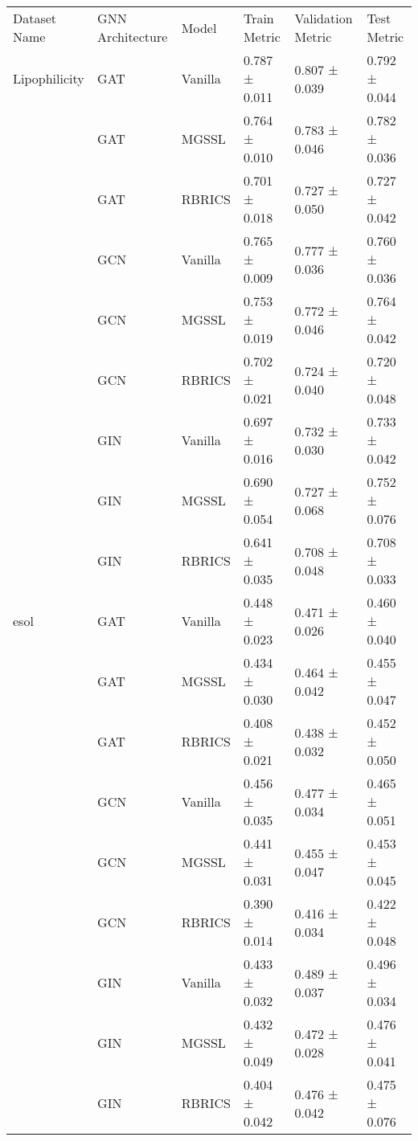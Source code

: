 \begin{tabular}{|l|l|l|l|l|l|}
\hline
Dataset Name & GNN Architecture & Model & Train Metric & Validation Metric & Test Metric \\

Lipophilicity & GAT & Vanilla & 0.787 ± 0.011 & 0.807 ± 0.039 & 0.792 ± 0.044 \\
 & GAT & MGSSL & 0.764 ± 0.010 & 0.783 ± 0.046 & 0.782 ± 0.036 \\
 & GAT & RBRICS & 0.701 ± 0.018 & 0.727 ± 0.050 & 0.727 ± 0.042 \\
 & GCN & Vanilla & 0.765 ± 0.009 & 0.777 ± 0.036 & 0.760 ± 0.036 \\
 & GCN & MGSSL & 0.753 ± 0.019 & 0.772 ± 0.046 & 0.764 ± 0.042 \\
 & GCN & RBRICS & 0.702 ± 0.021 & 0.724 ± 0.040 & 0.720 ± 0.048 \\
 & GIN & Vanilla & 0.697 ± 0.016 & 0.732 ± 0.030 & 0.733 ± 0.042 \\
 & GIN & MGSSL & 0.690 ± 0.054 & 0.727 ± 0.068 & 0.752 ± 0.076 \\
 & GIN & RBRICS & 0.641 ± 0.035 & 0.708 ± 0.048 & 0.708 ± 0.033 \\
esol & GAT & Vanilla & 0.448 ± 0.023 & 0.471 ± 0.026 & 0.460 ± 0.040 \\
 & GAT & MGSSL & 0.434 ± 0.030 & 0.464 ± 0.042 & 0.455 ± 0.047 \\
 & GAT & RBRICS & 0.408 ± 0.021 & 0.438 ± 0.032 & 0.452 ± 0.050 \\
 & GCN & Vanilla & 0.456 ± 0.035 & 0.477 ± 0.034 & 0.465 ± 0.051 \\
 & GCN & MGSSL & 0.441 ± 0.031 & 0.455 ± 0.047 & 0.453 ± 0.045 \\
 & GCN & RBRICS & 0.390 ± 0.014 & 0.416 ± 0.034 & 0.422 ± 0.048 \\
 & GIN & Vanilla & 0.433 ± 0.032 & 0.489 ± 0.037 & 0.496 ± 0.034 \\
 & GIN & MGSSL & 0.432 ± 0.049 & 0.472 ± 0.028 & 0.476 ± 0.041 \\
 & GIN & RBRICS & 0.404 ± 0.042 & 0.476 ± 0.042 & 0.475 ± 0.076 \\
\hline
\end{tabular}
